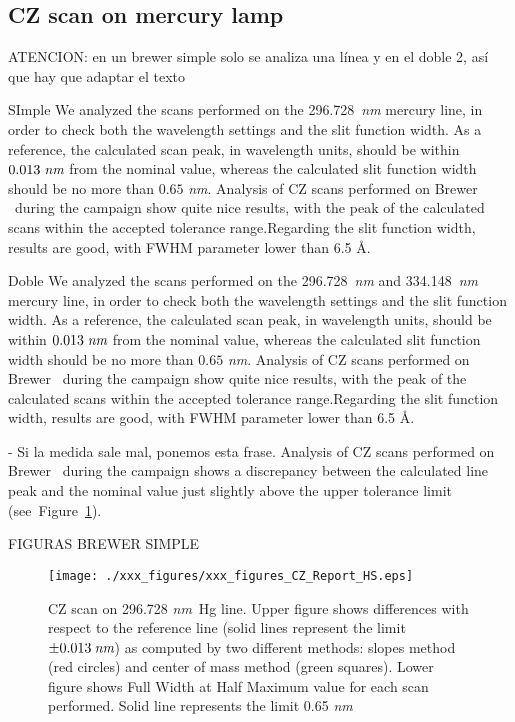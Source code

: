\subsection{CZ scan on mercury lamp} \label{subsec:CZ}

ATENCION: en un brewer simple solo se analiza una línea y en el doble 2, así que hay que adaptar el texto

SImple
We analyzed the scans performed on the 296.728\ \emph{nm} mercury line, in order to check both the wavelength settings and the slit function width. As a reference, the calculated scan peak, in wavelength units, should be within $ 0.013\;\emph{nm}$ from the nominal value, whereas the calculated slit function width should be no more than $0.65$ \emph{nm}. Analysis of CZ scans performed on Brewer \textbf{\brwname}\ during the campaign show quite nice results, with the peak of the calculated scans within the accepted tolerance range.Regarding the slit function width, results are good, with FWHM parameter lower than 6.5 \AA.

Doble
We analyzed the scans performed on the 296.728\ \emph{nm} and 334.148\ \emph{nm}  mercury line, in order to check both the wavelength settings and the slit function width. As a reference, the calculated scan peak, in wavelength units, should be within $ 0.013\;\emph{nm}$ from the nominal value, whereas the calculated slit function width should be no more than $0.65$ \emph{nm}. Analysis of CZ scans performed on Brewer \textbf{\brwname}\ during the campaign show quite nice results, with the peak of the calculated scans within the accepted tolerance range.Regarding the slit function width, results are good, with FWHM parameter lower than 6.5 \AA.

- Si la medida sale mal, ponemos esta frase.
Analysis of CZ scans performed on Brewer \textbf{\brwname}\ during the campaign shows a discrepancy between the calculated line peak and the nominal value just slightly above the upper tolerance limit \mbox{(see Figure \ref{fig:CZreport})}.


FIGURAS BREWER SIMPLE

\begin{figure}[hbtp!]
\begin{center}
\texttt{[image: ./xxx\_figures/xxx\_figures\_CZ\_Report\_HS.eps]}
           \caption{CZ scan on 296.728 \emph{nm}\ Hg line. Upper figure shows differences with respect to the reference line (solid lines represent the limit $\pm0.013\:\emph{nm}$) as computed by two different methods: slopes method (red circles) and center of mass method (green squares). Lower figure shows Full Width at Half Maximum value for each scan performed. Solid line represents the limit 0.65 \emph{nm}}
	         \label{fig:CZreport}
\end{center}
\end{figure}

